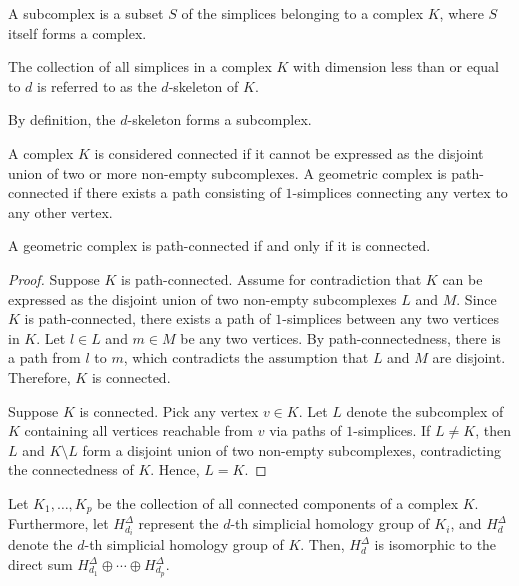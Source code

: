 \begin{definition}
	A subcomplex is a subset \( S \) of the simplices belonging to a complex \( K \), where \( S \) itself forms a complex.
\end{definition}

\begin{definition}
	The collection of all simplices in a complex \( K \) with dimension less than or equal to \( d \) is referred to as the \( d \)-skeleton of \( K \).
\end{definition}

By definition, the \( d \)-skeleton forms a subcomplex.

\begin{definition}
	A complex \( K \) is considered connected if it cannot be expressed as the disjoint union of two or more non-empty subcomplexes. A geometric complex is path-connected if there exists a path consisting of \( 1 \)-simplices connecting any vertex to any other vertex.
\end{definition}

\begin{lemma}
	\label{pathconnect}
	A geometric complex is path-connected if and only if it is connected.
\end{lemma}

\begin{proof}
	Suppose \( K \) is path-connected. Assume for contradiction that \( K \) can be expressed as the disjoint union of two non-empty subcomplexes \( L \) and \( M \). Since \( K \) is path-connected, there exists a path of \( 1 \)-simplices between any two vertices in \( K \). Let \( l \in L \) and \( m \in M \) be any two vertices. By path-connectedness, there is a path from \( l \) to \( m \), which contradicts the assumption that \( L \) and \( M \) are disjoint. Therefore, \( K \) is connected.
				
	Suppose \( K \) is connected. Pick any vertex \( v \in K \). Let \( L \) denote the subcomplex of \( K \) containing all vertices reachable from \( v \) via paths of \( 1 \)-simplices. If \( L \neq K \), then \( L \) and \( K \setminus L \) form a disjoint union of two non-empty subcomplexes, contradicting the connectedness of \( K \). Hence, \( L = K \).
\end{proof}

\begin{theorem}{\cite[p.105ff]{hatcher2005algebraic}}
	Let \( K_{1}, \ldots, K_{p} \) be the collection of all connected components of a complex \( K \). Furthermore, let \( H^{\Delta}_{d_i} \) represent the \( d \)-th simplicial homology group of \( K_{i} \), and \( H^{\Delta}_{d} \) denote the \( d \)-th simplicial homology group of \( K \). Then, \( H^{\Delta}_{d} \) is isomorphic to the direct sum \( H^{\Delta}_{d_1} \oplus \cdots \oplus H^{\Delta}_{d_p} \).
\end{theorem}

